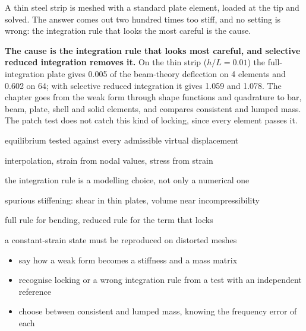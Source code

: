 \newpage\thispagestyle{hl}
\begin{hlquote}A thin steel strip is meshed with a standard plate element, loaded at the tip and solved. The answer comes out two hundred times too stiff, and no setting is wrong: the integration rule that looks the most careful is the cause.\end{hlquote}
\vspace{8pt}\begin{hlsum}\textbf{The cause is the integration rule that looks most careful, and selective reduced integration removes it.} On the thin strip ($h/L=0.01$) the full-integration plate gives 0.005 of the beam-theory deflection on 4 elements and 0.602 on 64; with selective reduced integration it gives 1.059 and 1.078. The chapter goes from the weak form through shape functions and quadrature to bar, beam, plate, shell and solid elements, and compares consistent and lumped mass. The patch test does not catch this kind of locking, since every element passes it.\end{hlsum}
\begin{description}\setlength\itemsep{5pt}\setlength\parsep{0pt}\renewcommand{\descriptionlabel}[1]{\hspace{\labelsep}\sffamily\bfseries\color{hlnavy}#1}
\item[Weak form] equilibrium tested against every admissible virtual displacement
\item[Shape functions, $\bm B$, $\bm D$] interpolation, strain from nodal values, stress from strain
\item[Gauss quadrature] the integration rule is a modelling choice, not only a numerical one
\item[Locking] spurious stiffening: shear in thin plates, volume near incompressibility
\item[Selective reduced integration] full rule for bending, reduced rule for the term that locks
\item[Patch test] a constant-strain state must be reproduced on distorted meshes
\end{description}
\begin{itemize}\setlength\itemsep{3pt}
\item say how a weak form becomes a stiffness and a mass matrix
\item recognise locking or a wrong integration rule from a test with an independent reference
\item choose between consistent and lumped mass, knowing the frequency error of each
\end{itemize}
